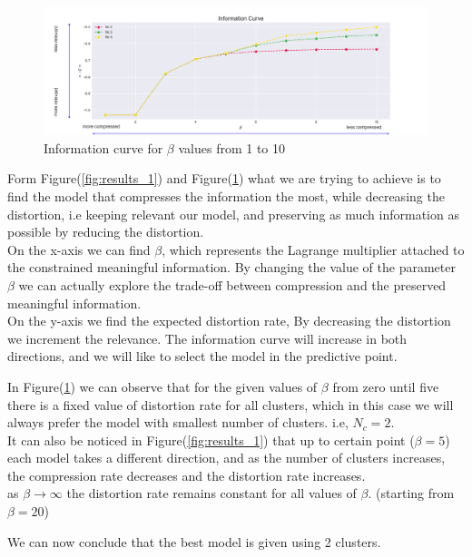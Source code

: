 \documentclass[11pt]{article}
\begin{document}
\begin{figure}[h!]
	\centering
	\hspace*{-1.5in}
	\includegraphics[width=220mm,scale=0.5]{beta_range_10.png}
	\caption{Information curve for $\beta$ values from 1 to 10}
	\label{fig:results_2}
\end{figure}
\pagebreak
Form Figure(\ref{fig:results_1}) and Figure(\ref{fig:results_2}) what we are trying to achieve is to find the model that compresses the information the most, while decreasing the distortion, i.e keeping relevant our model, and preserving as much information as possible by reducing the distortion. \\
On the x-axis we can find $\beta$, which represents the Lagrange multiplier attached to the constrained meaningful information. By changing the value of the parameter $\beta$ we can actually explore the trade-off between compression and the preserved meaningful information.\\

On the y-axis we find the expected distortion rate, By decreasing the distortion we increment the relevance. The information curve will increase in both directions, and we will like to select the model in the predictive point. 


In Figure(\ref{fig:results_2}) we can observe that for the given values of $\beta$ from zero until five there is a fixed value of distortion rate for all clusters, which in this case we will always prefer the model with smallest number of clusters. i.e, $N_{c}=2$.\\

It can also be noticed in Figure(\ref{fig:results_1}) that up to certain point ($\beta=5$) each model takes a different direction, and as the number of clusters increases, the compression rate decreases and the distortion rate increases. \\
 as $\beta \rightarrow \infty$ the distortion rate remains constant for all values of $\beta$. (starting from $\beta = 20$)

We can now conclude that the best model is given using 2 clusters.
\end{document}
